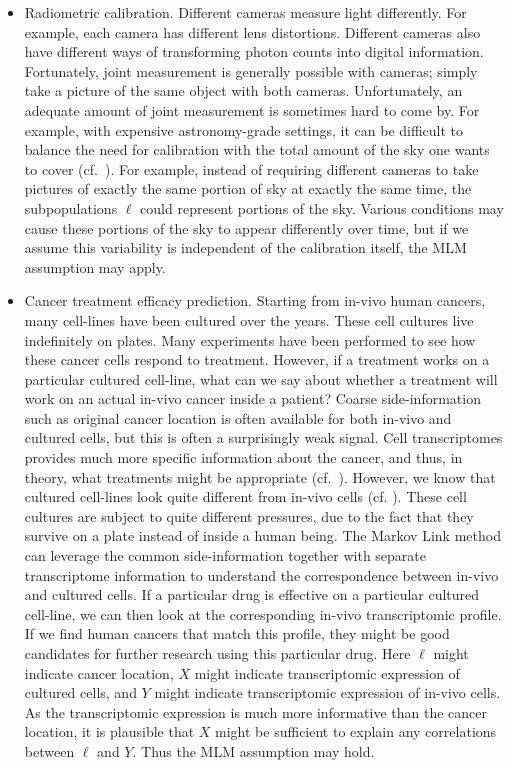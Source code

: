 \begin{itemize}
    \item Radiometric calibration.  Different cameras measure light differently.  For example, each camera has different lens distortions.  Different cameras also have different ways of transforming photon counts into digital information.   Fortunately, joint measurement is generally possible with cameras; simply take a picture of the same object with both cameras.  Unfortunately, an adequate amount of joint measurement is sometimes hard to come by.  For example, with expensive astronomy-grade settings, it can be difficult to balance the need for calibration with the total amount of the sky one wants to cover (cf.\ \cite{padmanabhan2008improved}). For example, instead of requiring different cameras to take pictures of exactly the same portion of sky at exactly the same time, the subpopulations $\ell$ could represent portions of the sky.  Various conditions may cause these portions of the sky to appear differently over time, but if we assume this variability is independent of the calibration itself, the MLM assumption may apply.  
 
    \item Cancer treatment efficacy prediction.  Starting from in-vivo human cancers, many cell-lines have been cultured over the years.  These cell cultures live indefinitely on plates.  Many experiments have been performed to see how these cancer cells respond to treatment.  However, if a treatment works on a particular cultured cell-line, what can we say about whether a treatment will work on an actual in-vivo cancer inside a patient?  Coarse side-information such as original cancer location is often available for both in-vivo and cultured cells, but this is often a surprisingly weak signal.  Cell transcriptomes provides much more specific information about the cancer, and thus, in theory, what treatments might be appropriate (cf.\ \cite{cieslik2018cancer}).  However, we know that cultured cell-lines look quite different from in-vivo cells (cf. \cite{imamura2015comparison,haibe2013inconsistency}).   These cell cultures are subject to quite different pressures, due to the fact that they survive on a plate instead of inside a human being.  The Markov Link method can leverage the common side-information together with separate transcriptome information to understand the correspondence between in-vivo and cultured cells.  If a particular drug is effective on a particular cultured cell-line, we can then look at the corresponding in-vivo transcriptomic profile.  If we find human cancers that match this profile, they might be good candidates for further research using this particular drug.  Here $\ell$ might indicate cancer location, $X$ might indicate transcriptomic expression of cultured cells, and $Y$ might indicate transcriptomic expression of in-vivo cells.  As the transcriptomic expression is much more informative than the cancer location, it is plausible that $X$ might be sufficient to explain any correlations between $\ell$ and $Y$.  Thus the MLM assumption may hold.


\end{itemize}
